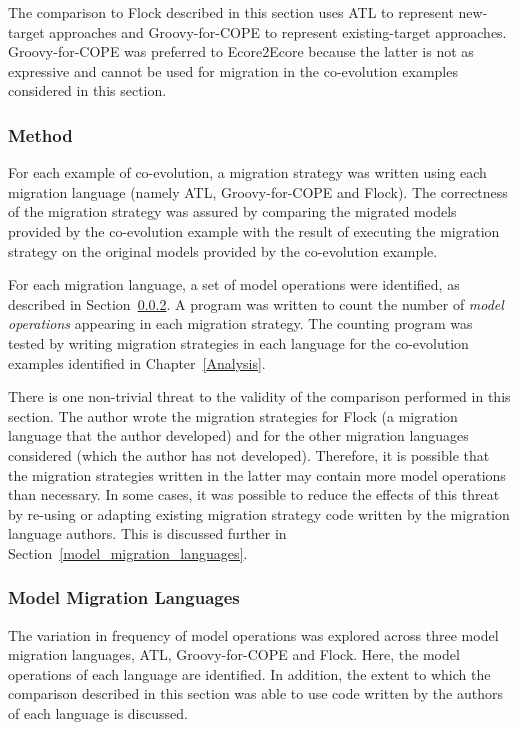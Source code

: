 The comparison to Flock described in this section uses ATL to represent new-target approaches and Groovy-for-COPE to represent existing-target approaches. Groovy-for-COPE was preferred to Ecore2Ecore because the latter is not as expressive and cannot be used for migration in the co-evolution examples considered in this section.

\subsubsection{Method}
For each example of co-evolution, a migration strategy was written using each migration language (namely ATL, Groovy-for-COPE and Flock). The correctness of the migration strategy was assured by comparing the migrated models provided by the co-evolution example with the result of executing the migration strategy on the original models provided by the co-evolution example.

For each migration language, a set of model operations were identified, as described in Section~\ref{subsec:model_migration_languages}. A program was written to count the number of \emph{model operations} appearing in each migration strategy. The counting program was tested by writing migration strategies in each language for the co-evolution examples identified in Chapter~\ref{Analysis}.

There is one non-trivial threat to the validity of the comparison performed in this section. The author wrote the migration strategies for Flock (a migration language that the author developed) and for the other migration languages considered (which the author has not developed). Therefore, it is possible that the migration strategies written in the latter may contain more model operations than necessary. In some cases, it was possible to reduce the effects of this threat by re-using or adapting existing migration strategy code written by the migration language authors. This is discussed further in Section~\ref{model_migration_languages}.


\subsubsection{Model Migration Languages}
\label{subsec:model_migration_languages}
The variation in frequency of model operations was explored across three model migration languages, ATL, Groovy-for-COPE and Flock. Here, the model operations of each language are identified. In addition, the extent to which the comparison described in this section was able to use code written by the authors of each language is discussed.


